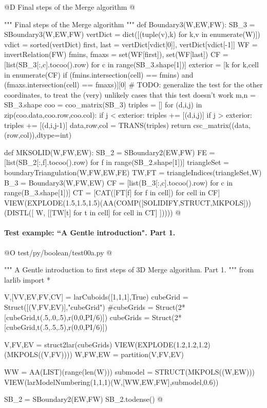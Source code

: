 \documentclass[11pt,oneside]{article}    %
\begin{document}
@D Final steps of the Merge algorithm
@{""" Final steps of the Merge algorithm """  
def Boundary3(W,EW,FW):
	SB_3 = SBoundary3(W,EW,FW)
	vertDict = dict([(tuple(v),k) for k,v in enumerate(W)])
	vdict = sorted(vertDict)
	first, last = vertDict[vdict[0]], vertDict[vdict[-1]]
	WF = invertRelation(FW)
	fmins, fmaxs = set(WF[first]), set(WF[last])
	CF = [list(SB_3[:,c].tocoo().row) for c in range(SB_3.shape[1])]
	exterior = [k for k,cell in enumerate(CF) if (fmins.intersection(cell) == fmins) 
		and (fmaxs.intersection(cell) == fmaxs)][0]
	# TODO: generalize the test for the other coordinates, to treat the (very) unlikely cases that this test doesn't work
	m,n = SB_3.shape
	coo = coo_matrix(SB_3)
	triples = []
	for (d,i,j) in zip(coo.data,coo.row,coo.col):
		if j < exterior:
			triples += [(d,i,j)]
		if j > exterior:
			triples += [(d,i,j-1)]
	data,row,col = TRANS(triples)
	return csc_matrix((data,(row,col)),dtype=int)

def MKSOLID(W,FW,EW):
	SB_2 = SBoundary2(EW,FW)
	FE = [list(SB_2[:,f].tocoo().row) for f in range(SB_2.shape[1])]
	triangleSet = boundaryTriangulation(W,FW,EW,FE)
	TW,FT = triangleIndices(triangleSet,W)
	B_3 = Boundary3(W,FW,EW)
	CF = [list(B_3[:,c].tocoo().row) for c in range(B_3.shape[1])]
	CT = [CAT([FT[f] for f in cell]) for cell in CF] 
	VIEW(EXPLODE(1.5,1.5,1.5)(AA(COMP([SOLIDIFY,STRUCT,MKPOLS]))(DISTL([ W, 
		[[TW[t] for t in cell] for cell in CT] ]))))
@}


\paragraph{Test example: ``A Gentle introduction". Part 1.}
@O test/py/boolean/test00a.py
@{""" A Gentle introduction to first steps of 3D Merge algorithm. Part 1. """
from larlib import *

V,[VV,EV,FV,CV] = larCuboids([1,1,1],True)
cubeGrid = Struct([(V,FV,EV)],"cubeGrid")
#cubeGrids = Struct(2*[cubeGrid,t(.5,.0,.5),r(0,0,PI/6)])
cubeGrids = Struct(2*[cubeGrid,t(.5,.5,.5),r(0,0,PI/6)])

V,FV,EV = struct2lar(cubeGrids)
VIEW(EXPLODE(1.2,1.2,1.2)(MKPOLS((V,FV))))
W,FW,EW = partition(V,FV,EV)

WW = AA(LIST)(range(len(W)))
submodel = STRUCT(MKPOLS((W,EW)))
VIEW(larModelNumbering(1,1,1)(W,[WW,EW,FW],submodel,0.6)) 

SB_2 = SBoundary2(EW,FW)
SB_2.todense()
@}
\end{document}
